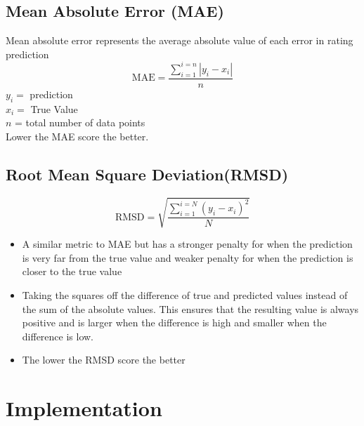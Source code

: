 \subsection{Mean Absolute Error (MAE)}
Mean absolute error represents the average absolute value of each error in rating prediction
\begin{equation*}
\text{MAE} = \frac{\sum^{i=n}_{i=1}|y_{i} - x_{i}|}{n}
\end{equation*}
$y_{i}  = $ prediction
\\$x_{i}  = $ True Value
\\$n$ = total number of data points
\\Lower the MAE score the better.

\subsection{Root Mean Square Deviation(RMSD)}
\begin{equation*}
\text{RMSD} = \sqrt{\frac{\sum^{i=N}_{i=1}(y_{i} - x_{i})^{2}}{N}}
\end{equation*}

\begin{itemize}
\item A similar metric to MAE but has a stronger penalty for when the prediction is very far from the true value and weaker penalty for when the prediction is closer to the true value
\item Taking the squares off the difference of true and predicted values instead of the sum of the absolute values. This ensures that the resulting value is always positive and is larger when the difference is high and smaller when the difference is low.
\item The lower the RMSD score the better
\end{itemize}


\section{Implementation}
